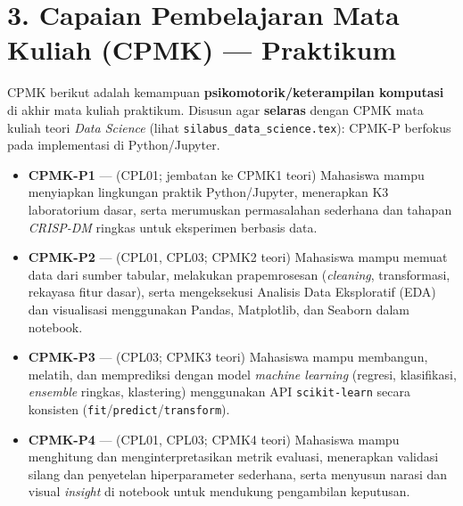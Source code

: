\documentclass[12pt,a4paper]{article}
\begin{document}
\vspace{0.5cm}

\section*{3. Capaian Pembelajaran Mata Kuliah (CPMK) --- Praktikum}

CPMK berikut adalah kemampuan \textbf{psikomotorik/keterampilan komputasi} di akhir mata kuliah praktikum. Disusun agar \textbf{selaras} dengan CPMK mata kuliah teori \textit{Data Science} (lihat \texttt{silabus\_data\_science.tex}): CPMK-P berfokus pada implementasi di Python/Jupyter.

\begin{itemize}[leftmargin=*]
  \item \textbf{CPMK-P1} --- (CPL01; jembatan ke CPMK1 teori) Mahasiswa mampu menyiapkan lingkungan praktik Python/Jupyter, menerapkan K3 laboratorium dasar, serta merumuskan permasalahan sederhana dan tahapan \textit{CRISP-DM} ringkas untuk eksperimen berbasis data.

  \item \textbf{CPMK-P2} --- (CPL01, CPL03; CPMK2 teori) Mahasiswa mampu memuat data dari sumber tabular, melakukan prapemrosesan (\textit{cleaning}, transformasi, rekayasa fitur dasar), serta mengeksekusi Analisis Data Eksploratif (EDA) dan visualisasi menggunakan Pandas, Matplotlib, dan Seaborn dalam notebook.

  \item \textbf{CPMK-P3} --- (CPL03; CPMK3 teori) Mahasiswa mampu membangun, melatih, dan memprediksi dengan model \textit{machine learning} (regresi, klasifikasi, \textit{ensemble} ringkas, klastering) menggunakan API \texttt{scikit-learn} secara konsisten (\texttt{fit}/\texttt{predict}/\texttt{transform}).

  \item \textbf{CPMK-P4} --- (CPL01, CPL03; CPMK4 teori) Mahasiswa mampu menghitung dan menginterpretasikan metrik evaluasi, menerapkan validasi silang dan penyetelan hiperparameter sederhana, serta menyusun narasi dan visual \textit{insight} di notebook untuk mendukung pengambilan keputusan.
\end{itemize}

\vspace{0.5cm}
\end{document}
